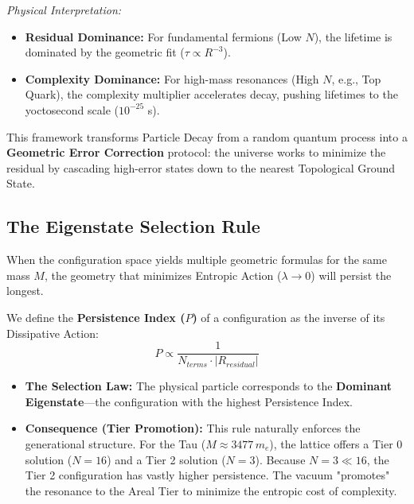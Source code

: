 \textit{Physical Interpretation:}
\begin{itemize}
    \item \textbf{Residual Dominance:} For fundamental fermions (Low $N$), the lifetime is dominated by the geometric fit ($\tau \propto R^{-3}$).
    \item \textbf{Complexity Dominance:} For high-mass resonances (High $N$, e.g., Top Quark), the complexity multiplier accelerates decay, pushing lifetimes to the yoctosecond scale ($10^{-25}$ s).
\end{itemize}

This framework transforms Particle Decay from a random quantum process into a \textbf{Geometric Error Correction} protocol: the universe works to minimize the residual by cascading high-error states down to the nearest Topological Ground State.

\subsection*{The Eigenstate Selection Rule}

When the configuration space yields multiple geometric formulas for the same mass $M$, the geometry that minimizes Entropic Action ($\lambda \to 0$) will persist the longest.

We define the \textbf{Persistence Index ($P$)} of a configuration as the inverse of its Dissipative Action:
\[ P \propto \frac{1}{N_{terms} \cdot |R_{residual}|} \]

\begin{itemize}
    \item \textbf{The Selection Law:} The physical particle corresponds to the \textbf{Dominant Eigenstate}—the configuration with the highest Persistence Index.
    \item \textbf{Consequence (Tier Promotion):} This rule naturally enforces the generational structure. For the Tau ($M \approx 3477 \, m_e$), the lattice offers a Tier 0 solution ($N=16$) and a Tier 2 solution ($N=3$). Because $N=3 \ll 16$, the Tier 2 configuration has vastly higher persistence. The vacuum "promotes" the resonance to the Areal Tier to minimize the entropic cost of complexity.
\end{itemize}